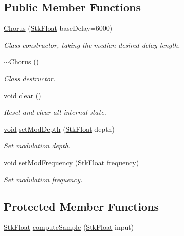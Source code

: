 \subsection*{Public Member Functions}
\begin{DoxyCompactItemize}
\item 
\hyperlink{class_nyq_1_1_chorus_ad30973654367f22ebdd2a05604076d71}{Chorus} (\hyperlink{namespace_nyq_a044fa20a706520a617bbbf458a7db7e4}{Stk\+Float} base\+Delay=6000)
\begin{DoxyCompactList}\small\item\em Class constructor, taking the median desired delay length. \end{DoxyCompactList}\item 
\hyperlink{class_nyq_1_1_chorus_a9523639e0b028e0847092fab8e93481f}{$\sim$\+Chorus} ()
\begin{DoxyCompactList}\small\item\em Class destructor. \end{DoxyCompactList}\item 
\hyperlink{sound_8c_ae35f5844602719cf66324f4de2a658b3}{void} \hyperlink{class_nyq_1_1_chorus_ab38dd18ea0b304e38ed04f5b479be32f}{clear} ()
\begin{DoxyCompactList}\small\item\em Reset and clear all internal state. \end{DoxyCompactList}\item 
\hyperlink{sound_8c_ae35f5844602719cf66324f4de2a658b3}{void} \hyperlink{class_nyq_1_1_chorus_af4e834c2787443a9f339f5988d4964fd}{set\+Mod\+Depth} (\hyperlink{namespace_nyq_a044fa20a706520a617bbbf458a7db7e4}{Stk\+Float} depth)
\begin{DoxyCompactList}\small\item\em Set modulation depth. \end{DoxyCompactList}\item 
\hyperlink{sound_8c_ae35f5844602719cf66324f4de2a658b3}{void} \hyperlink{class_nyq_1_1_chorus_a2000850b04b120b134bf20249ac14946}{set\+Mod\+Frequency} (\hyperlink{namespace_nyq_a044fa20a706520a617bbbf458a7db7e4}{Stk\+Float} frequency)
\begin{DoxyCompactList}\small\item\em Set modulation frequency. \end{DoxyCompactList}\end{DoxyCompactItemize}
\subsection*{Protected Member Functions}
\begin{DoxyCompactItemize}
\item 
\hyperlink{namespace_nyq_a044fa20a706520a617bbbf458a7db7e4}{Stk\+Float} \hyperlink{class_nyq_1_1_chorus_ae974831d9e54a9ea8ba70ce995fc291f}{compute\+Sample} (\hyperlink{namespace_nyq_a044fa20a706520a617bbbf458a7db7e4}{Stk\+Float} input)
\end{DoxyCompactItemize}
